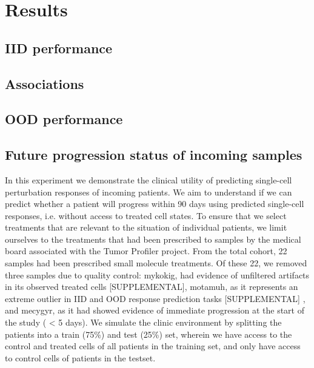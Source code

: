 \section{Results}

\subsection{IID performance}

\subsection{Associations}

\subsection{OOD performance}

\subsection{Future progression status of incoming samples}
In this experiment we demonstrate the clinical utility of predicting single-cell perturbation responses of incoming patients. We aim to understand if we can predict whether a patient will progress within 90 days using predicted single-cell responses, i.e. without access to treated cell states. To ensure that we select treatments that are relevant to the situation of individual patients, we limit ourselves to the treatments that had been prescribed to samples by the medical board associated with the Tumor Profiler project. From the total cohort, 22 samples had been prescribed small molecule treatments. Of these 22, we removed three samples due to quality control: mykokig, had evidence of unfiltered artifacts in its observed treated cells [SUPPLEMENTAL], motamuh, as it represents an extreme outlier in IID and OOD response prediction tasks [SUPPLEMENTAL] , and mecygyr, as it had showed evidence of immediate progression at the start of the study ( < 5 days). We simulate the clinic environment by splitting the patients into a train (75\%) and test (25\%) set, wherein we have access to the control and treated cells of all patients in the training set, and only have access to control cells of patients in the testset.

